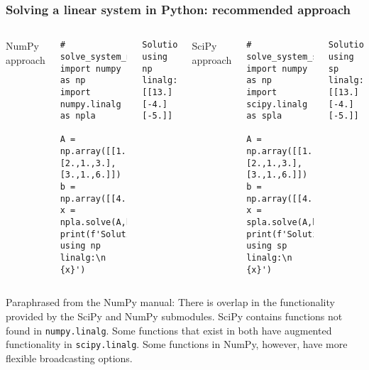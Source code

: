 \begin{frame}[fragile]
  \frametitle{Solving a linear system in Python: recommended approach}
  \begin{columns}
      NumPy approach
      \begin{lstlisting}
# solve_system_np.py
import numpy as np
import numpy.linalg as npla

A = np.array([[1.,1.,1.],[2.,1.,3.],[3.,1.,6.]])
b = np.array([[4.,7.,5.]]).T
x = npla.solve(A,b)
print(f'Solution using np linalg:\n {x}')
        \end{lstlisting}
        \begin{lstlisting}[style=output]
Solution using np linalg:
[[13.]
[-4.]
[-5.]]
        \end{lstlisting}
    SciPy approach
    \begin{lstlisting}
# solve_system_sp.py
import numpy as np
import scipy.linalg as spla

A = np.array([[1.,1.,1.],[2.,1.,3.],[3.,1.,6.]])
b = np.array([[4.,7.,5.]]).T
x = spla.solve(A,b)
print(f'Solution using sp linalg:\n {x}')      
      \end{lstlisting}
      \begin{lstlisting}[style=output]
Solution using sp linalg:
[[13.]
[-4.]
[-5.]]
    \end{lstlisting}
  \end{columns}
  Paraphrased from the NumPy manual:
  There is overlap in the functionality provided by the SciPy and NumPy submodules. SciPy contains functions not found in \lstinline$numpy.linalg$. Some functions that exist in both have augmented functionality in \lstinline$scipy.linalg$. Some functions in NumPy, however, have more flexible broadcasting options.
\end{frame}

